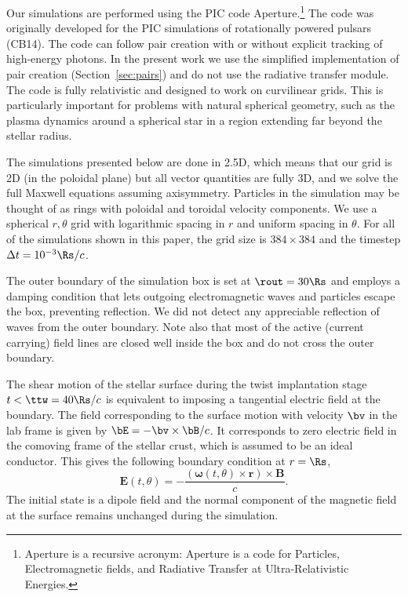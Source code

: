 Our simulations are performed using the PIC code Aperture.\footnote{Aperture is
  a recursive acronym:
  Aperture is a code for Particles, Electromagnetic
  fields, and Radiative Transfer at Ultra-Relativistic Energies.} The code was
originally developed for the PIC simulations of rotationally powered pulsars
(CB14). The code can follow pair creation with or without explicit tracking of
high-energy photons. In the present work we use the simplified implementation of
pair creation (Section~\ref{sec:pairs}) and do not use the radiative transfer
module. The code is fully relativistic and designed to work on curvilinear
grids. This is particularly important for problems with natural spherical
geometry, such as the plasma dynamics around a spherical star in a region
extending far beyond the stellar radius.

The simulations presented below are done in 2.5D, which means that our grid is
2D (in the poloidal plane) but all vector quantities are fully 3D, and we solve
the full Maxwell equations assuming axisymmetry. Particles in the simulation may
be thought of as rings with poloidal and toroidal velocity components. We use a
spherical $r,\theta$ grid with logarithmic spacing in $r$ and uniform spacing in
$\theta$. For all of the simulations shown in this paper, the grid size is
$384\times 384$ and the timestep $\Delta t = 10^{-3}\Rs/c$.

The outer boundary of the simulation box is set at $\rout = 30\Rs$ and employs
a damping condition that lets outgoing electromagnetic waves and particles escape
the box, preventing reflection.
We did not detect any appreciable reflection of waves from the outer boundary.
Note also that most of the active (current carrying) field lines are
closed well inside the box and do not cross the outer boundary.

The shear motion of the stellar surface during the twist implantation stage
$t<\ttw=40\Rs/c$ is equivalent to imposing a tangential electric field at the
boundary. The field corresponding to the surface motion with velocity $\bv$ in
the lab frame is given by $\bE=-\bv\times\bB/c$. It corresponds to zero electric
field in the comoving frame of the stellar crust, which is assumed to be an
ideal conductor. This gives the following boundary condition at $r=\Rs$,
\begin{equation}
  \label{eq:4}
  \mathbf{E}(t,\theta) =
  -\frac{( \boldsymbol{\omega}(t,\theta)\times \mathbf{r})\times \mathbf{B}}{c}.
\end{equation}
The initial state is a dipole field and the normal component of the magnetic field
at the surface remains unchanged during the simulation.


